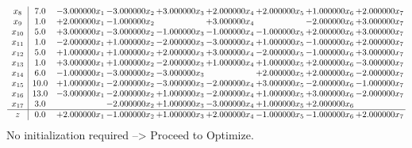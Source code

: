 \documentclass[10pt]{article}
\begin{document}
\[\begin{array}{c| c c@{\hskip 2pt} c@{\hskip 2pt} c@{\hskip 2pt} c@{\hskip 2pt} c@{\hskip 2pt} c@{\hskip 2pt} c@{\hskip 2pt} }
 x_{8}   &  7.0 & -3.000000 x_{1} & -3.000000 x_{2} & + 3.000000 x_{3} & + 2.000000 x_{4} & + 2.000000 x_{5} & + 1.000000 x_{6} & + 2.000000 x_{7}\\
 x_{9}   &  1.0 & + 2.000000 x_{1} & -1.000000 x_{2} &   & + 3.000000 x_{4} &   & -2.000000 x_{6} & + 3.000000 x_{7}\\
 x_{10}   &  5.0 & + 3.000000 x_{1} & -3.000000 x_{2} & -1.000000 x_{3} & -1.000000 x_{4} & -1.000000 x_{5} & + 2.000000 x_{6} & + 3.000000 x_{7}\\
 x_{11}   &  1.0 & -2.000000 x_{1} & + 1.000000 x_{2} & -2.000000 x_{3} & -3.000000 x_{4} & + 1.000000 x_{5} & -1.000000 x_{6} & + 2.000000 x_{7}\\
 x_{12}   &  5.0 & + 1.000000 x_{1} & + 1.000000 x_{2} & + 2.000000 x_{3} & + 3.000000 x_{4} & -2.000000 x_{5} & -1.000000 x_{6} & + 3.000000 x_{7}\\
 x_{13}   &  1.0 & + 3.000000 x_{1} & + 1.000000 x_{2} & -2.000000 x_{3} & + 1.000000 x_{4} & + 1.000000 x_{5} & + 2.000000 x_{6} & -3.000000 x_{7}\\
 x_{14}   &  6.0 & -1.000000 x_{1} & -3.000000 x_{2} & -3.000000 x_{3} &   & + 2.000000 x_{5} & + 2.000000 x_{6} & -2.000000 x_{7}\\
 x_{15}   &  10.0 & + 1.000000 x_{1} & -2.000000 x_{2} & -3.000000 x_{3} & -2.000000 x_{4} & + 3.000000 x_{5} & -2.000000 x_{6} & -1.000000 x_{7}\\
 x_{16}   &  13.0 & -3.000000 x_{1} & -2.000000 x_{2} & + 1.000000 x_{3} & -2.000000 x_{4} & + 1.000000 x_{5} & + 3.000000 x_{6} & -2.000000 x_{7}\\
 x_{17}   &  3.0  &   & -2.000000 x_{2} & + 1.000000 x_{3} & -3.000000 x_{4} & + 1.000000 x_{5} & + 2.000000 x_{6} &   \\
\hline
z    &  0.0 & + 2.000000 x_{1} & -1.000000 x_{2} & + 1.000000 x_{3} & + 2.000000 x_{4} & -1.000000 x_{5} & -1.000000 x_{6} & + 2.000000 x_{7}\\
\end{array}\]
No initialization required --> Proceed to Optimize. 
\end{document}
